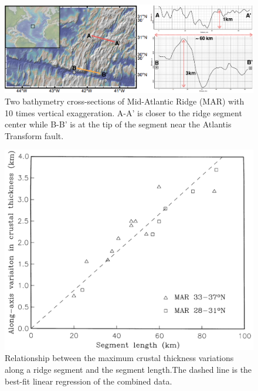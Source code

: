 \begin{figure}[H]
 \centering
  \includegraphics[scale=0.4]{./Figures/fig_Intro2_1.png}
 \caption{\small{Two bathymetry cross-sections of Mid-Atlantic Ridge (MAR) with 10 times vertical exaggeration. A-A' is closer to the ridge segment center while B-B' is at the tip of the segment near the Atlantis Transform fault.}}
 \label{fig_Intro2_1}
\end{figure}

\begin{figure}[H]
 \centering
  \includegraphics[scale=0.3]{./Figures/fig_Intro3_1.png}
 \caption{\small{Relationship between the maximum crustal thickness variations along a ridge segment and the segment length.The dashed line is the best-fit linear regression of the combined data. \citep{Chen1999}}}
 \label{fig_Intro3_1}
\end{figure}

%

